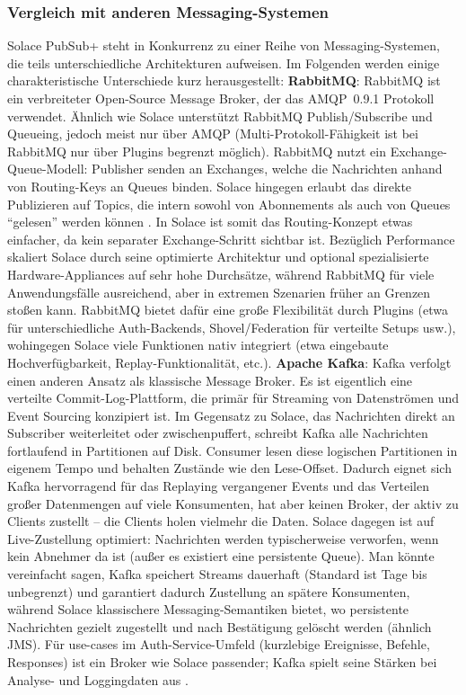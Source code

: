 \subsubsection{Vergleich mit anderen Messaging-Systemen}
Solace PubSub+ steht in Konkurrenz zu einer Reihe von Messaging-Systemen, die teils unterschiedliche Architekturen aufweisen. Im Folgenden werden einige charakteristische Unterschiede kurz herausgestellt:
\textbf{RabbitMQ}: RabbitMQ ist ein verbreiteter Open-Source Message Broker, der das AMQP 0.9.1 Protokoll verwendet. Ähnlich wie Solace unterstützt RabbitMQ Publish/Subscribe und Queueing, jedoch meist nur über AMQP (Multi-Protokoll-Fähigkeit ist bei RabbitMQ nur über Plugins begrenzt möglich). RabbitMQ nutzt ein Exchange-Queue-Modell: Publisher senden an Exchanges, welche die Nachrichten anhand von Routing-Keys an Queues binden. Solace hingegen erlaubt das direkte Publizieren auf Topics, die intern sowohl von Abonnements als auch von Queues “gelesen” werden können \cite{SolaceTopicWildcard}. In Solace ist somit das Routing-Konzept etwas einfacher, da kein separater Exchange-Schritt sichtbar ist. Bezüglich Performance skaliert Solace durch seine optimierte Architektur und optional spezialisierte Hardware-Appliances auf sehr hohe Durchsätze, während RabbitMQ für viele Anwendungsfälle ausreichend, aber in extremen Szenarien früher an Grenzen stoßen kann. RabbitMQ bietet dafür eine große Flexibilität durch Plugins (etwa für unterschiedliche Auth-Backends, Shovel/Federation für verteilte Setups usw.), wohingegen Solace viele Funktionen nativ integriert (etwa eingebaute Hochverfügbarkeit, Replay-Funktionalität, etc.).
\textbf{Apache Kafka}: Kafka verfolgt einen anderen Ansatz als klassische Message Broker. Es ist eigentlich eine verteilte Commit-Log-Plattform, die primär für Streaming von Datenströmen und Event Sourcing konzipiert ist. Im Gegensatz zu Solace, das Nachrichten direkt an Subscriber weiterleitet oder zwischenpuffert, schreibt Kafka alle Nachrichten fortlaufend in Partitionen auf Disk. Consumer lesen diese logischen Partitionen in eigenem Tempo und behalten Zustände wie den Lese-Offset. Dadurch eignet sich Kafka hervorragend für das Replaying vergangener Events und das Verteilen großer Datenmengen auf viele Konsumenten, hat aber keinen Broker, der aktiv zu Clients zustellt – die Clients holen vielmehr die Daten. Solace dagegen ist auf Live-Zustellung optimiert: Nachrichten werden typischerweise verworfen, wenn kein Abnehmer da ist (außer es existiert eine persistente Queue). Man könnte vereinfacht sagen, Kafka speichert Streams dauerhaft (Standard ist Tage bis unbegrenzt) und garantiert dadurch Zustellung an spätere Konsumenten, während Solace klassischere Messaging-Semantiken bietet, wo persistente Nachrichten gezielt zugestellt und nach Bestätigung gelöscht werden (ähnlich JMS). Für use-cases im Auth-Service-Umfeld (kurzlebige Ereignisse, Befehle, Responses) ist ein Broker wie Solace passender; Kafka spielt seine Stärken bei Analyse- und Loggingdaten aus \cite{Kreps2011}.
